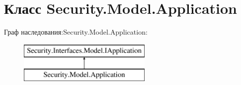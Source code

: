 \hypertarget{class_security_1_1_model_1_1_application}{}\section{Класс Security.\+Model.\+Application}
\label{class_security_1_1_model_1_1_application}
Граф наследования\+:Security.\+Model.\+Application\+:\begin{figure}[H]
\begin{center}
\leavevmode
\includegraphics[height=2.000000cm]{d8/d71/class_security_1_1_model_1_1_application}
\end{center}
\end{figure}
